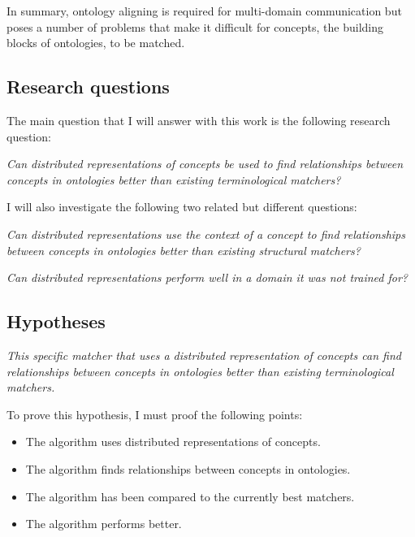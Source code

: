 \documentclass{article}
\begin{document}
 In summary, ontology aligning is required for multi-domain communication but poses a number of problems that make it difficult for concepts, the building blocks of ontologies, to be matched.
 \subsection{Research questions}
 The main question that I will answer with this work is the following research question:
 
 \begin{center}
 \textit{
 Can distributed representations of concepts be used to find relationships between concepts in ontologies better than existing terminological matchers?
 }
 \end{center}
 
 I will also investigate the following two related but different questions:
 
 \begin{center}
 \textit{
 Can distributed representations use the context of a concept to find relationships between concepts in ontologies better than existing structural matchers?
 }
 \end{center}
 
 \begin{center}
 \textit{
 Can distributed representations perform well in a domain it was not trained for?
 }
 \end{center}
 
 \subsection{Hypotheses} 
 \begin{center}
 \textit{This specific matcher that uses a distributed representation of concepts can find relationships between concepts in ontologies better than existing terminological matchers.}
 \end{center}

 To prove this hypothesis, I must proof the following points:
 \begin{itemize}
 \item The algorithm uses distributed representations of concepts.
 \item The algorithm finds relationships between concepts in ontologies.
 \item The algorithm has been compared to the currently best matchers.
 \item The algorithm performs better.
 \end{itemize} 
 
\end{document}
